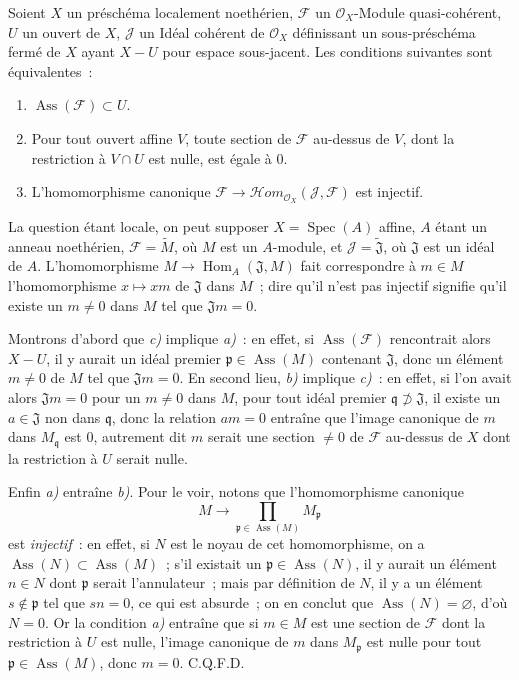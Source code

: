 \begin{proposition}[3.1.8]
\label{IV.2.3.1.8-fr}
Soient $X$ un préschéma localement noethérien, $\mathcal F$ un
$\mathcal O_X$-Module quasi-cohérent, $U$ un ouvert de $X$, $\mathcal J$ un
Idéal cohérent de $\mathcal O_X$ définissant un sous-préschéma fermé de $X$
ayant $X-U$ pour espace sous-jacent. Les conditions suivantes sont
équivalentes~:
\begin{enumerate}
\item[\emph{a)}] $\operatorname{Ass}(\mathcal F)\subset U$.
\item[\emph{b)}] Pour tout ouvert affine $V$, toute section de $\mathcal F$
au-dessus de $V$, dont la restriction à $V\cap U$ est nulle, est égale à $0$.
\item[\emph{c)}] L'homomorphisme canonique
$\mathcal F\to\mathcal Hom_{\mathcal O_X}(\mathcal J,\mathcal F)$ est
injectif.
\end{enumerate}
\end{proposition}

La question étant locale, on peut supposer $X=\operatorname{Spec}(A)$ affine,
$A$ étant un anneau noethérien, $\mathcal F=\widetilde M$, où $M$ est un
$A$-module, et $\mathcal J=\widetilde{\mathfrak J}$, où $\mathfrak J$ est un
idéal de $A$. L'homomorphisme $M\to\operatorname{Hom}_A(\mathfrak J,M)$ fait
correspondre à $m\in M$ l'homomorphisme $x\mapsto xm$ de $\mathfrak J$ dans
$M$~; dire qu'il n'est pas injectif signifie qu'il existe un $m\ne0$ dans
$M$ tel que $\mathfrak Jm=0$.

Montrons d'abord que \emph{c)} implique \emph{a)}~: en effet, si
$\operatorname{Ass}(\mathcal F)$ rencontrait alors $X-U$, il y aurait un
idéal premier $\mathfrak p\in\operatorname{Ass}(M)$ contenant $\mathfrak J$,
donc un élément $m\ne0$ de $M$ tel que $\mathfrak Jm=0$. En second lieu,
\emph{b)} implique \emph{c)}~: en effet, si l'on avait alors
$\mathfrak Jm=0$ pour un $m\ne0$ dans $M$, pour tout idéal premier
$\mathfrak q\not\supset\mathfrak J$, il existe un $a\in\mathfrak J$ non dans
$\mathfrak q$, donc la relation $am=0$ entraîne que l'image canonique de $m$
dans $M_\mathfrak q$ est $0$, autrement dit $m$ serait une section $\ne0$ de
$\mathcal F$ au-dessus de $X$ dont la restriction à $U$ serait nulle.

Enfin \emph{a)} entraîne \emph{b)}. Pour le voir, notons que l'homomorphisme
canonique
\[
M\longrightarrow\prod_{\mathfrak p\in\operatorname{Ass}(M)}M_\mathfrak p
\]
est \emph{injectif}~: en effet, si $N$ est le noyau de cet homomorphisme, on a
$\operatorname{Ass}(N)\subset\operatorname{Ass}(M)$~; s'il existait un
$\mathfrak p\in\operatorname{Ass}(N)$, il y aurait un élément $n\in N$ dont
$\mathfrak p$ serait l'annulateur~; mais par définition de $N$, il y a un
élément $s\notin\mathfrak p$ tel que $sn=0$, ce qui est absurde~; on en conclut
que $\operatorname{Ass}(N)=\varnothing$, d'où $N=0$. Or la condition
\emph{a)} entraîne que si $m\in M$ est une section de $\mathcal F$ dont la
restriction à $U$ est nulle, l'image canonique de $m$ dans $M_\mathfrak p$ est
nulle pour tout $\mathfrak p\in\operatorname{Ass}(M)$, donc $m=0$. C.Q.F.D.

